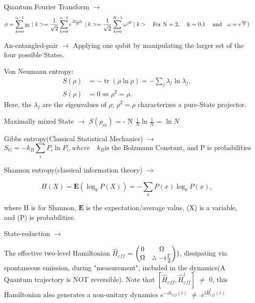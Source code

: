 \documentclass[a4paper, 10pt, onepage]{elegantbook}
\begin{document}
{Quantum Fourier Transform $\longrightarrow$
\begin{equation}
\phi = \sum_{k = 0}^{n - 1} y_k \mid k> = \frac{1}{\sqrt 2} \sum_{k = 0}^{n - 1} e^{ \frac{2 \pi {ijk}}{N}} \mid k> = 
\frac{1}{\sqrt 2} \sum_{k = 0}^{N - 1} \omega^{jk} \mid k> \text{\quad For N = 2, \quad k = 0,1 \quad and} \quad \omega 
= e^{\frac{2 \pi}{N}})
\end{equation}

  
An-entangled-pair $\longrightarrow$ Applying one qubit by manipulating the larger set of the 
four possible States.

Von Neumann entropy:
\begin{equation}
	\begin{aligned}
		S(\rho)
		&= -\operatorname{tr}(\rho \ln \rho)
		= -\sum_j \lambda_j \ln \lambda_j,\\
		S(\rho) &= 0
		\iff \rho^2 = \rho.
	\end{aligned}
\end{equation}
Here, the \(\lambda_j\) are the eigenvalues of \(\rho\); \(\rho^2=\rho\) characterizes a pure-State projector.

\medskip

Maximally mixed State $\longrightarrow$ $S(\rho_m)$ = - N $\frac{1}{N} \ln \frac{1}{N}$ = $\ln N$

\medskip

Gibbs entropy(Classical Statistical Mechanics) $\longrightarrow$
\begin{equation}
S_G = - k_B \sum_i {P_i \ln P_i}, where \quad k_B \text{is the Bolzmann Constant, and P is probabilities}
\end{equation}  
  
Shannon entropy(classical information theory) $\longrightarrow$

\begin{equation}
H(X) = \mathbf E(\log_b P(X)) = - \sum_x P(x) \log_b P(x),
\end{equation}

where H is for Shannon, $\mathbf{E}$ is the expectation/average value, (X) is a variable, and (P) is probabilities.
  
State-reduction $\longrightarrow$

The effective two-level Hamiltonian
$\hat H_{eff}$ = $\begin{pmatrix}0 & \Omega \cr \Omega & \vartriangle - i \frac{\Gamma}{2} \end{pmatrix} )$,
dissipating via spontaneous emission, during "measurement", included in the dynamics(A Quantum trajectory is NOT 
reversible).
Note that $[\hat H_{eff}, \hat H^\dagger_{eff}]$ $\neq$ 0,
this Hamiltonian also generates a non-unitary dynamics $e^{- i \hbar_{eff}(t)}$ $\neq$ $e^{i \hat H^\dagger_{eff}(t)}$

}
\end{document}
